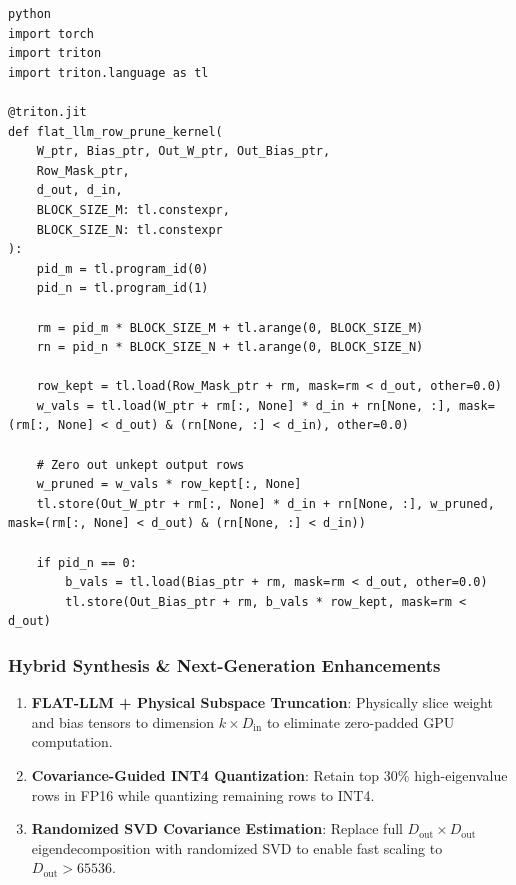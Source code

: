 \vspace{0.5em}
\begin{mdframed}[backgroundcolor=codebg, linecolor=codeframe, linewidth=1pt, roundcorner=4pt, innerleftmargin=2pt, innerrightmargin=5pt, innertopmargin=5pt, innerbottommargin=5pt]
\begin{lstlisting}
python
import torch
import triton
import triton.language as tl

@triton.jit
def flat_llm_row_prune_kernel(
    W_ptr, Bias_ptr, Out_W_ptr, Out_Bias_ptr,
    Row_Mask_ptr,
    d_out, d_in,
    BLOCK_SIZE_M: tl.constexpr,
    BLOCK_SIZE_N: tl.constexpr
):
    pid_m = tl.program_id(0)
    pid_n = tl.program_id(1)

    rm = pid_m * BLOCK_SIZE_M + tl.arange(0, BLOCK_SIZE_M)
    rn = pid_n * BLOCK_SIZE_N + tl.arange(0, BLOCK_SIZE_N)

    row_kept = tl.load(Row_Mask_ptr + rm, mask=rm < d_out, other=0.0)
    w_vals = tl.load(W_ptr + rm[:, None] * d_in + rn[None, :], mask=(rm[:, None] < d_out) & (rn[None, :] < d_in), other=0.0)

    # Zero out unkept output rows
    w_pruned = w_vals * row_kept[:, None]
    tl.store(Out_W_ptr + rm[:, None] * d_in + rn[None, :], w_pruned, mask=(rm[:, None] < d_out) & (rn[None, :] < d_in))

    if pid_n == 0:
        b_vals = tl.load(Bias_ptr + rm, mask=rm < d_out, other=0.0)
        tl.store(Out_Bias_ptr + rm, b_vals * row_kept, mask=rm < d_out)
\end{lstlisting}
\end{mdframed}
\vspace{0.5em}


\subsubsection*{Hybrid Synthesis \& Next-Generation Enhancements}

\begin{enumerate}
\item \textbf{FLAT-LLM + Physical Subspace Truncation}: Physically slice weight and bias tensors to dimension $k \times D_{\text{in}}$ to eliminate zero-padded GPU computation.
\item \textbf{Covariance-Guided INT4 Quantization}: Retain top $30\%$ high-eigenvalue rows in FP16 while quantizing remaining rows to INT4.
\item \textbf{Randomized SVD Covariance Estimation}: Replace full $D_{\text{out}} \times D_{\text{out}}$ eigendecomposition with randomized SVD to enable fast scaling to $D_{\text{out}} > 65536$.

\end{enumerate}
